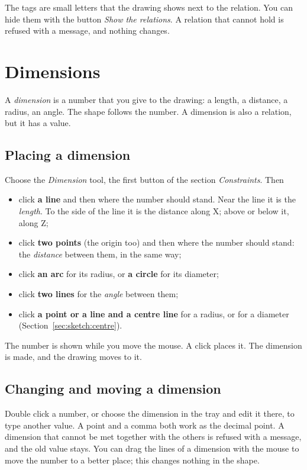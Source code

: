 The tags are small letters that the drawing shows next to the relation. You can hide them with the button \emph{Show the relations}. A relation that cannot hold is refused with a message, and nothing changes.

\section{Dimensions}\label{sec:sketch:dimensions}

A \emph{dimension} is a number that you give to the drawing: a length, a distance, a radius, an angle. The shape follows the number. A dimension is also a relation, but it has a value.

\subsection{Placing a dimension}\label{sec:sketch:placing}
Choose the \emph{Dimension} tool, the first button of the section \emph{Constraints}. Then

\begin{itemize}
\item click \textbf{a line} and then where the number should stand. Near the line it is the \emph{length}. To the side of the line it is the distance along X; above or below it, along Z;
\item click \textbf{two points} (the origin too) and then where the number should stand: the \emph{distance} between them, in the same way;
\item click \textbf{an arc} for its radius, or \textbf{a circle} for its diameter;
\item click \textbf{two lines} for the \emph{angle} between them;
\item click \textbf{a point or a line and a centre line} for a radius, or for a diameter (Section~\ref{sec:sketch:centre}).
\end{itemize}

The number is shown while you move the mouse. A click places it. The dimension is made, and the drawing moves to it.

\subsection{Changing and moving a dimension}
Double click a number, or choose the dimension in the tray and edit it there, to type another value. A point and a comma both work as the decimal point. A dimension that cannot be met together with the others is refused with a message, and the old value stays. You can drag the lines of a dimension with the mouse to move the number to a better place; this changes nothing in the shape.

